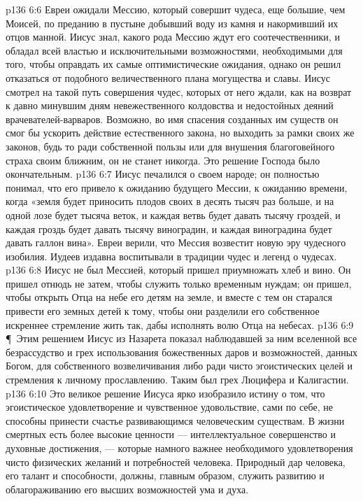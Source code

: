 \vs p136 6:6 Евреи ожидали Мессию, который совершит чудеса, еще большие, чем Моисей, по преданию в пустыне добывший воду из камня и накормивший их отцов манной. Иисус знал, какого рода Мессию ждут его соотечественники, и обладал всей властью и исключительными возможностями, необходимыми для того, чтобы оправдать их самые оптимистические ожидания, однако он решил отказаться от подобного величественного плана могущества и славы. Иисус смотрел на такой путь совершения чудес, которых от него ждали, как на возврат к давно минувшим дням невежественного колдовства и недостойных деяний врачевателей\hyp{}варваров. Возможно, во имя спасения созданных им существ он смог бы ускорить действие естественного закона, но выходить за рамки своих же законов, будь то ради собственной пользы или для внушения благоговейного страха своим ближним, он не станет никогда. Это решение Господа было окончательным.
\vs p136 6:7 Иисус печалился о своем народе; он полностью понимал, что его привело к ожиданию будущего Мессии, к ожиданию времени, когда «земля будет приносить плодов своих в десять тысяч раз больше, и на одной лозе будет тысяча веток, и каждая ветвь будет давать тысячу гроздей, и каждая гроздь будет давать тысячу виноградин, и каждая виноградина будет давать галлон вина». Евреи верили, что Мессия возвестит новую эру чудесного изобилия. Иудеев издавна воспитывали в традиции чудес и легенд о чудесах.
\vs p136 6:8 Иисус не был Мессией, который пришел приумножать хлеб и вино. Он пришел отнюдь не затем, чтобы служить только временным нуждам; он пришел, чтобы открыть Отца на небе его детям на земле, и вместе с тем он старался привести его земных детей к тому, чтобы они разделили его собственное искреннее стремление жить так, дабы исполнять волю Отца на небесах.
\vs p136 6:9 \P\ Этим решением Иисус из Назарета показал наблюдавшей за ним вселенной все безрассудство и грех использования божественных даров и возможностей, данных Богом, для собственного возвеличивания либо ради чисто эгоистических целей и стремления к личному прославлению. Таким был грех Люцифера и Калигастии.
\vs p136 6:10 Это великое решение Иисуса ярко изобразило истину о том, что эгоистическое удовлетворение и чувственное удовольствие, сами по себе, не способны принести счастье развивающимся человеческим существам. В жизни смертных есть более высокие ценности --- интеллектуальное совершенство и духовные достижения, --- которые намного важнее необходимого удовлетворения чисто физических желаний и потребностей человека. Природный дар человека, его талант и способности, должны, главным образом, служить развитию и облагораживанию его высших возможностей ума и духа.
